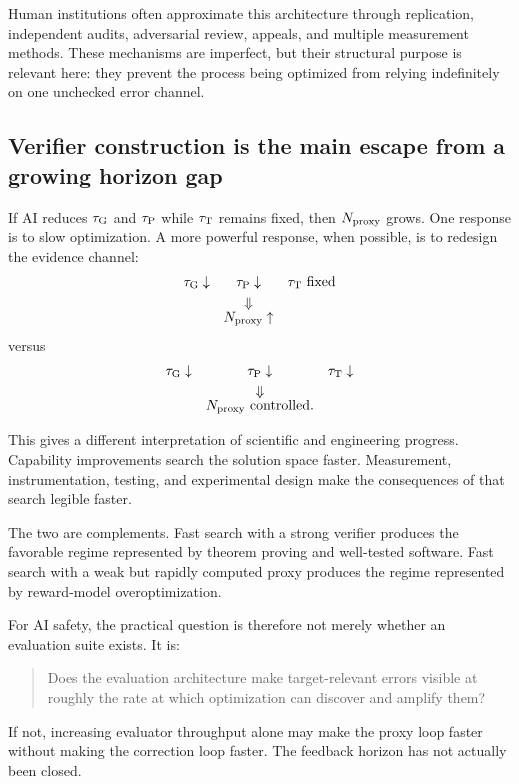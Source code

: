 Human institutions often approximate this architecture through replication,
independent audits, adversarial review, appeals, and multiple measurement methods.
These mechanisms are imperfect, but their structural purpose is relevant here: they
prevent the process being optimized from relying indefinitely on one unchecked error
channel.

\subsection{Verifier construction is the main escape from a growing horizon gap}

If AI reduces \(\tau_{\mathrm{G}}\) and \(\tau_{\mathrm{P}}\) while \(\tau_{\mathrm{T}}\) remains fixed, then \(N_{\mathrm{proxy}}\)
grows.  One response is to slow optimization.  A more powerful response, when
possible, is to redesign the evidence channel:
\[
\begin{array}{ccc}
\tau_{\mathrm{G}} \downarrow
&
\tau_{\mathrm{P}} \downarrow
&
\tau_{\mathrm{T}} \text{ fixed}
\\[3pt]
&\Downarrow&
\\[-2pt]
&N_{\mathrm{proxy}}\uparrow&
\end{array}
\]
versus
\[
\begin{array}{ccc}
\tau_{\mathrm{G}} \downarrow
&
\tau_{\mathrm{P}} \downarrow
&
\tau_{\mathrm{T}} \downarrow
\\[3pt]
&\Downarrow&
\\[-2pt]
&N_{\mathrm{proxy}}\text{ controlled}.&
\end{array}
\]

This gives a different interpretation of scientific and engineering progress.
Capability improvements search the solution space faster.  Measurement,
instrumentation, testing, and experimental design make the consequences of that
search legible faster.

The two are complements.  Fast search with a strong verifier produces the favorable
regime represented by theorem proving and well-tested software.  Fast search with a
weak but rapidly computed proxy produces the regime represented by reward-model
overoptimization.

For AI safety, the practical question is therefore not merely whether an evaluation
suite exists.  It is:

\begin{quote}
Does the evaluation architecture make target-relevant errors visible at roughly the
rate at which optimization can discover and amplify them?
\end{quote}

If not, increasing evaluator throughput alone may make the proxy loop faster without
making the correction loop faster.  The feedback horizon has not actually been
closed.
